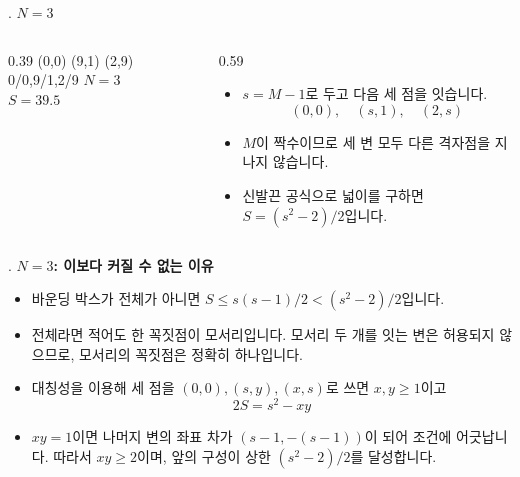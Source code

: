 \begin{frame}{\textbf{\pletter}. \ptitle}
    \textbf{$N=3$}
    \begin{columns}[c,onlytextwidth]
        \begin{column}{0.39\textwidth}
            \centering
                {(0,0) (9,1) (2,9)}
                {0/0,9/1,2/9}
                {$N=3$\\$S=39.5$}
        \end{column}
        \begin{column}{0.59\textwidth}
            \begin{itemize}
                \item $s=M-1$로 두고 다음 세 점을 잇습니다.
                \[
                    (0,0),\quad(s,1),\quad(2,s)
                \]
                \item $M$이 짝수이므로 세 변 모두 다른 격자점을 지나지 않습니다.
                \item 신발끈 공식으로 넓이를 구하면 $S=(s^2-2)/2$입니다.
            \end{itemize}
        \end{column}
    \end{columns}
\end{frame}

\begin{frame}{\textbf{\pletter}. \ptitle}
    \textbf{$N=3$: 이보다 커질 수 없는 이유}
    \begin{itemize}
        \item 바운딩 박스가 전체가 아니면 $S\le s(s-1)/2<(s^2-2)/2$입니다.
        \item 전체라면 적어도 한 꼭짓점이 모서리입니다. 모서리 두 개를 잇는 변은 허용되지 않으므로,
              모서리의 꼭짓점은 정확히 하나입니다.
        \item 대칭성을 이용해 세 점을 $(0,0),(s,y),(x,s)$로 쓰면 $x,y\ge1$이고
        \[
            2S=s^2-xy
        \]
        \item $xy=1$이면 나머지 변의 좌표 차가 $(s-1,-(s-1))$이 되어 조건에 어긋납니다.
              따라서 $xy\ge2$이며, 앞의 구성이 상한 $(s^2-2)/2$를 달성합니다.
    \end{itemize}
\end{frame}

